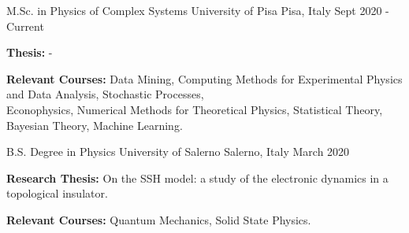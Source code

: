 \begin{cventries}
  \cventry
    {M.Sc. in Physics of Complex Systems} %
    {University of Pisa} %
    {Pisa, Italy} %
    {Sept 2020 - Current} %
    {
      \begin{cvitems} %
        \item {\textbf{Thesis: } -}
        \item {\textbf{Relevant Courses:} Data Mining, Computing Methods for Experimental Physics and Data Analysis, Stochastic Processes,\\
        Econophysics, Numerical Methods for Theoretical Physics, Statistical Theory, Bayesian Theory, Machine Learning.}
      \end{cvitems}
    }
    
  \cventry
    {B.S. Degree in Physics} %
    {University of Salerno} %
    {Salerno, Italy} %
    {March 2020} %
    {
      \begin{cvitems} %
        \item {\textbf{Research Thesis:} On the SSH model: a study of the electronic dynamics in a topological insulator.}
        \item {\textbf{Relevant Courses:} Quantum Mechanics, Solid State Physics.}
      \end{cvitems}
    }

\end{cventries}
